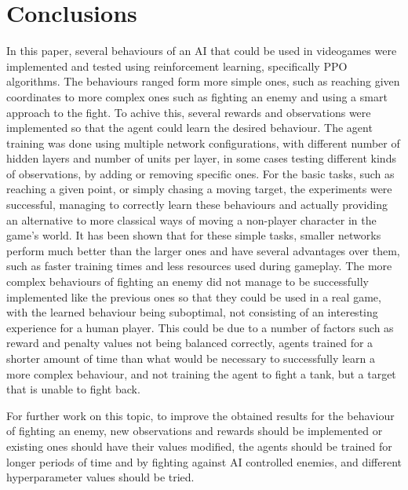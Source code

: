 \chapter{Conclusions}



In this paper, several behaviours of an AI that could be used in videogames were implemented and tested using reinforcement learning, specifically PPO algorithms. The behaviours ranged form more simple ones, such as reaching given coordinates to more complex ones such as fighting an enemy and using a smart approach to the fight. To achive this, several rewards and observations were implemented so that the agent could learn the desired behaviour. The agent training was done using multiple network configurations, with different number of hidden layers and number of units per layer, in some cases testing different kinds of observations, by adding or removing specific ones. For the basic tasks, such as reaching a given point, or simply chasing a moving target, the experiments were successful, managing to correctly learn these behaviours and actually providing an alternative to more classical ways of moving a non-player character in the game's world. It has been shown that for these simple tasks, smaller networks perform much better than the larger ones and have several advantages over them, such as faster training times and less resources used during gameplay. The more complex behaviours of fighting an enemy did not manage to be successfully implemented like the previous ones so that they could be used in a real game, with the learned behaviour being suboptimal, not consisting of an interesting experience for a human player. This could be due to a number of factors such as reward and penalty values not being balanced correctly, agents trained for a shorter amount of time than what would be necessary to successfully learn a more complex behaviour, and not training the agent to fight a tank, but a target that is unable to fight back.

For further work on this topic, to improve the obtained results for the behaviour of fighting an enemy, new observations and rewards should be implemented or existing ones should have their values modified, the agents should be trained for longer periods of time and by fighting against AI controlled enemies, and different hyperparameter values should be tried.